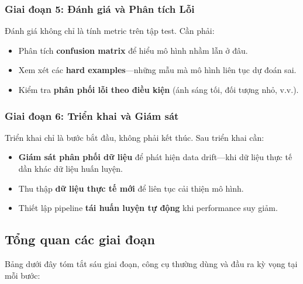 \subsubsection{Giai đoạn 5: Đánh giá và Phân tích Lỗi}

Đánh giá không chỉ là tính metric trên tập test. Cần phải:

\begin{itemize}
    \item Phân tích \textbf{confusion matrix} để hiểu mô hình nhầm lẫn ở đâu.
    \item Xem xét các \textbf{hard examples}---những mẫu mà mô hình liên tục dự đoán sai.
    \item Kiểm tra \textbf{phân phối lỗi theo điều kiện} (ánh sáng tối, đối tượng nhỏ, v.v.).
\end{itemize}

\subsubsection{Giai đoạn 6: Triển khai và Giám sát}

Triển khai chỉ là bước bắt đầu, không phải kết thúc. Sau triển khai cần:

\begin{itemize}
    \item \textbf{Giám sát phân phối dữ liệu} để phát hiện data drift---khi dữ liệu thực tế dần khác dữ liệu huấn luyện.
    \item Thu thập \textbf{dữ liệu thực tế mới} để liên tục cải thiện mô hình.
    \item Thiết lập pipeline \textbf{tái huấn luyện tự động} khi performance suy giảm.
\end{itemize}

\subsection{Tổng quan các giai đoạn}
\label{subsec:stages_overview_table}

Bảng dưới đây tóm tắt sáu giai đoạn, công cụ thường dùng và đầu ra kỳ vọng tại mỗi bước:

